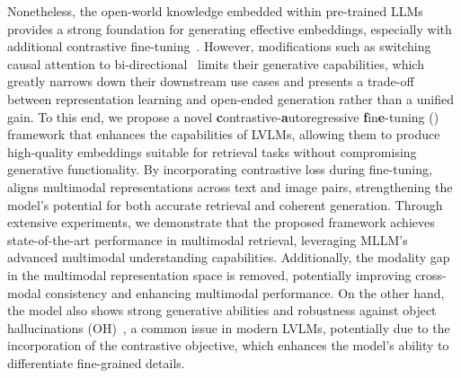 Nonetheless, the open-world knowledge embedded within pre-trained LLMs provides a strong foundation for generating effective embeddings, especially with additional contrastive fine-tuning~\citep{behnamghader2024llm2vec, jiang2024vlm2vec}.
%
However, modifications such as switching causal attention to bi-directional~\citep{behnamghader2024llm2vec} limits their generative capabilities, which greatly narrows down their downstream use cases and presents a trade-off between representation learning and open-ended generation rather than a unified gain.
%
To this end, we propose a novel \textbf{c}ontrastive-\textbf{a}utoregressive \textbf{f}in\textbf{e}-tuning (\textbf{\algname}) framework that enhances the capabilities of LVLMs, allowing them to produce high-quality embeddings suitable for retrieval tasks without compromising generative functionality. 
%
By incorporating contrastive loss during fine-tuning, \algname aligns multimodal representations across text and image pairs, strengthening the model’s potential for both accurate retrieval and coherent generation. 
%
Through extensive experiments, we demonstrate that the proposed framework achieves state-of-the-art performance in multimodal retrieval, leveraging MLLM's advanced multimodal understanding capabilities. 
%
Additionally, the modality gap~\citep{liang2022mind} in 
the multimodal representation space is removed, potentially improving cross-modal consistency and enhancing multimodal performance.
%
On the other hand, the model also shows strong generative abilities and robustness against object hallucinations (OH)~\citep{biten2022let,zhou2023analyzing, chen2024halc, fang2024uncertainty}, a common issue in modern LVLMs, potentially due to the incorporation of the contrastive objective, which enhances the model's ability to differentiate fine-grained details.

